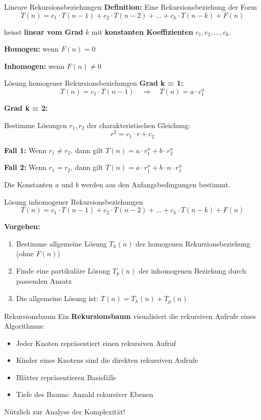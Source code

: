 \documentclass[a4paper, fontsize=7pt]{scrartcl}
\begin{document}
\begin{mainbox}{Lineare Rekursionsbeziehungen}
\textbf{Definition:} Eine Rekursionsbeziehung der Form
$$T(n) = c_1 \cdot T(n-1) + c_2 \cdot T(n-2) + \ldots + c_k \cdot T(n-k) + F(n)$$

heisst \textbf{linear vom Grad} $k$ mit \textbf{konstanten Koeffizienten} $c_1, c_2, \ldots, c_k$.

\textbf{Homogen:} wenn $F(n) = 0$

\textbf{Inhomogen:} wenn $F(n) \neq 0$
\end{mainbox}

\begin{mainbox}{Lösung homogener Rekursionsbeziehungen}
\textbf{Grad k = 1:}
$$T(n) = c_1 \cdot T(n-1) \quad \Rightarrow \quad T(n) = a \cdot c_1^n$$

\textbf{Grad k = 2:}

Bestimme Lösungen $r_1, r_2$ der charakteristischen Gleichung:
$$r^2 = c_1 \cdot r + c_2$$

\textbf{Fall 1:} Wenn $r_1 \neq r_2$, dann gilt $T(n) = a \cdot r_1^n + b \cdot r_2^n$

\textbf{Fall 2:} Wenn $r_1 = r_2$, dann gilt $T(n) = a \cdot r_1^n + b \cdot n \cdot r_1^n$

Die Konstanten $a$ und $b$ werden aus den Anfangsbedingungen bestimmt.
\end{mainbox}

\begin{mainbox}{Lösung inhomogener Rekursionsbeziehungen}
$$T(n) = c_1 \cdot T(n-1) + c_2 \cdot T(n-2) + \ldots + c_k \cdot T(n-k) + F(n)$$

\textbf{Vorgehen:}
\begin{enumerate}
    \item Bestimme allgemeine Lösung $T_h(n)$ der homogenen Rekursionsbeziehung (ohne $F(n)$)
    \item Finde eine partikuläre Lösung $T_p(n)$ der inhomogenen Beziehung durch passenden Ansatz
    \item Die allgemeine Lösung ist: $T(n) = T_h(n) + T_p(n)$
\end{enumerate}
\end{mainbox}

\begin{subbox}{Rekursionsbaum}
Ein \textbf{Rekursionsbaum} visualisiert die rekursiven Aufrufe eines Algorithmus:
\begin{itemize}
    \item Jeder Knoten repräsentiert einen rekursiven Aufruf
    \item Kinder eines Knotens sind die direkten rekursiven Aufrufe
    \item Blätter repräsentieren Basisfälle
    \item Tiefe des Baums: Anzahl rekursiver Ebenen
\end{itemize}

Nützlich zur Analyse der Komplexität!
\end{subbox}
\end{document}
